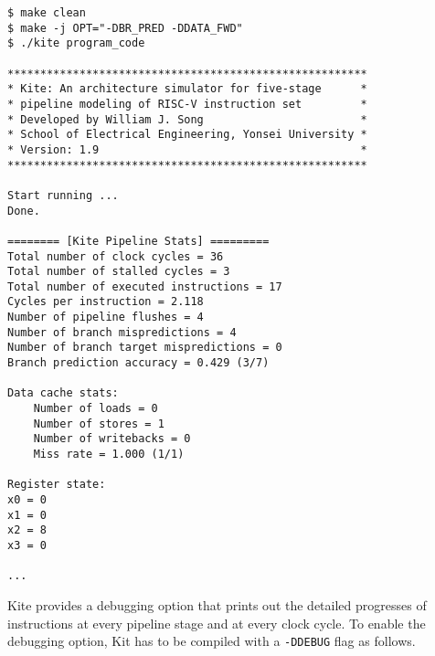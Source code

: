 \documentclass[10pt]{article}
\begin{document}
\begin{Verbatim}[frame=single]
$ make clean
$ make -j OPT="-DBR_PRED -DDATA_FWD"
$ ./kite program_code

*******************************************************
* Kite: An architecture simulator for five-stage      *
* pipeline modeling of RISC-V instruction set         *
* Developed by William J. Song                        *
* School of Electrical Engineering, Yonsei University *
* Version: 1.9                                        *
*******************************************************

Start running ...
Done.

======== [Kite Pipeline Stats] =========
Total number of clock cycles = 36
Total number of stalled cycles = 3
Total number of executed instructions = 17
Cycles per instruction = 2.118
Number of pipeline flushes = 4
Number of branch mispredictions = 4
Number of branch target mispredictions = 0
Branch prediction accuracy = 0.429 (3/7)

Data cache stats:
    Number of loads = 0
    Number of stores = 1
    Number of writebacks = 0
    Miss rate = 1.000 (1/1)

Register state:
x0 = 0
x1 = 0
x2 = 8
x3 = 0

...

\end{Verbatim}

Kite provides a debugging option that prints out the detailed progresses of instructions at every pipeline stage and at every clock cycle.
To enable the debugging option, Kit has to be compiled with a {\tt -DDEBUG} flag as follows.
\end{document}
